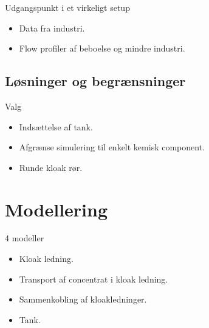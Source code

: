 \begin{frame}{Udgangspunkt i et virkeligt setup}{}
\vfill\vfill\centering
\begin{itemize}
	\item Data fra industri.
	\item Flow profiler af beboelse og mindre industri.
\end{itemize}
\vfill\vfill	
\end{frame}

\subsection{Løsninger og begrænsninger}
\begin{frame}{Valg}{}
\vfill\vfill\centering
\begin{itemize}
	\item<1-> Indsættelse af tank.
	\item<2-> Afgrænse simulering til enkelt kemisk component.
	\item<3-> Runde kloak rør.
\end{itemize}
\vfill\vfill	
\end{frame}

\section{Modellering}

\begin{frame}{4 modeller}{}
	\vfill\vfill\centering
\begin{itemize}
	\item Kloak ledning.
	\item Transport af concentrat i kloak ledning.
	\item Sammenkobling af kloakledninger.
	\item Tank. 
\end{itemize}
\vfill\vfill		
\end{frame}

